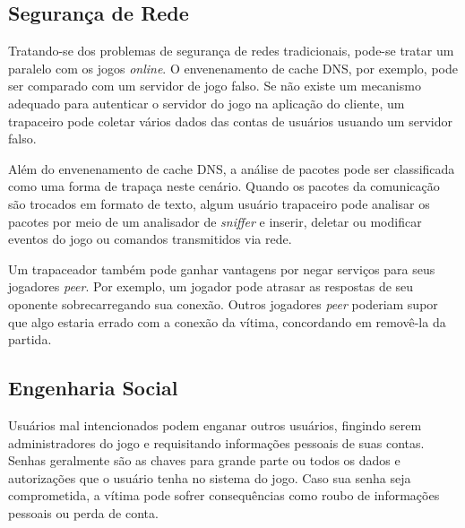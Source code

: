 \subsection{Segurança de Rede}

Tratando-se dos problemas de segurança de redes tradicionais, pode-se tratar um paralelo com os jogos \textit{online}. O envenenamento de cache DNS, por exemplo, pode ser comparado com um servidor de jogo falso. Se não existe um mecanismo adequado para autenticar o servidor do jogo na aplicação do cliente, um trapaceiro pode coletar vários dados das contas de usuários usuando um servidor falso.

Além do envenenamento de cache DNS, a análise de pacotes pode ser classificada como uma forma de trapaça neste cenário. 
Quando os pacotes da comunicação são trocados em formato de texto, algum usuário trapaceiro pode analisar os pacotes por meio de um analisador de \textit{sniffer} e inserir, deletar ou modificar eventos do jogo ou comandos transmitidos via rede. 

Um trapaceador também pode ganhar vantagens por negar serviços para seus jogadores \textit{peer}. Por exemplo, um jogador pode atrasar as respostas de seu oponente sobrecarregando sua conexão. Outros jogadores \textit{peer} poderiam supor que algo estaria errado com a conexão da vítima, concordando em removê-la da partida. 

\nocite{new}
\nocite{Cadar:2008:KUA:1855741.1855756}
\nocite{Izaiku:2006:CDM:1230040.1230056}
\nocite{Monch:2006:POG:1230040.1230087}
\nocite{Mitterhofer:2009:SBD:1591889.1592174}
\nocite{Yan:2003:SDO:956415.956453}
\nocite{Feng:2008:SMC:1517494.1517497}
\nocite{Kabus:2005:ACD:1103599.1103607}

\subsection {Engenharia Social}

Usuários mal intencionados podem enganar outros usuários, fingindo serem administradores do jogo e requisitando informações pessoais de suas contas. Senhas geralmente são as chaves para grande parte ou todos os dados e autorizações que o usuário tenha no sistema do jogo. Caso sua senha seja comprometida, a vítima pode sofrer consequências como roubo de informações pessoais ou perda de conta.

